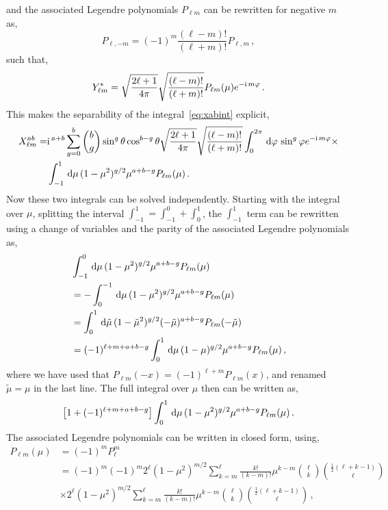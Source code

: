 and the associated Legendre polynomials $P_{\ell m}$ can be rewritten for negative $m$ as, 
\begin{equation}
	P_{\ell,-m} = (-1)^m \frac{(\ell - m)!}{(\ell + m)!} P_{\ell,m}\,,
\end{equation}
such that, 
\begin{equation}
	Y^*_{\ell m} = \sqrt{\frac{2\ell + 1}{4 \pi}} \sqrt{\frac{(\ell - m)!}{(\ell + m)!}} P_{\ell m}(\mu) e^{-\mathrm{i\,} m \varphi} \,.
\end{equation}
This makes the separability of the integral~\eqref{eq:xabint} explicit, 
\begin{align}
	X_{\ell m}^{ab} =& \mathrm{i\,}^{a+b} \sum_{g=0}^b \binom{b}{g} \sin^g\theta \cos^{b-g}\theta \sqrt{\frac{2\ell + 1}{4\pi}} \sqrt{\frac{(\ell - m)!}{(\ell + m)!}} \int_0^{2\pi}\,\mathrm{d}\varphi\, \sin^g\varphi e^{-\mathrm{i\,} m \varphi} \times \nonumber \\
	& \int_{-1}^1 \,\mathrm{d}\mu\, (1-\mu^2)^{g/2} \mu^{a+b-g} P_{\ell m}(\mu)\,.
\end{align}
Now these two integrals can be solved independently. Starting with the integral over $\mu$, splitting the interval $\int_{-1}^1 = \int_{-1}^0 + \int_0^1$, the $\int_{-1}^1$ term can be rewritten using a change of variables and the parity of the associated Legendre polynomials as, 
\begin{align}
	&\int_{-1}^0\,\mathrm{d}\mu\, (1-\mu^2)^{g/2} \mu^{a+b-g} P_{\ell m}(\mu) \nonumber \\
	&= - \int_0^{-1}\,\mathrm{d}\mu\, (1-\mu^2)^{g/2} \mu^{a+b-g} P_{\ell m}(\mu) \nonumber \\
	&= \int_0^1\,\mathrm{d}\tilde{\mu}\, (1-\tilde{\mu}^2)^{g/2}(-\tilde{\mu})^{a+b-g} P_{\ell m}(-\tilde{\mu}) \nonumber \\
	&= (-1)^{\ell + m + a + b - g} \int_0^1 \,\mathrm{d}\mu\, (1-\mu)^{g/2} \mu^{a+b-g} P_{\ell m}(\mu)\,,
\end{align}
where we have used that $P_{\ell m}(-x) = (-1)^{\ell + m} P_{\ell m}(x)$, and renamed $\tilde{\mu} = \mu$ in the last line. The full integral over $\mu$ then can be written as, 
\begin{equation}
	\left[ 1 + (-1)^{\ell+m+a+b-g} \right] \int_0^1 \,\mathrm{d}\mu\, (1-\mu^2)^{g/2} \mu^{a+b-g} P_{\ell m}(\mu)\,.
\end{equation}
The associated Legendre polynomials can be written in closed form, using, 
\begin{align}
	P_{\ell m}(\mu) &= (-1)^m P_\ell^m \nonumber \\
	&= (-1)^m (-1)^m 2^\ell (1-\mu^2)^{m/2} \sum_{k = m}^\ell \frac{k!}{(k-m)!} \mu^{k-m} \binom{\ell}{k} \binom{\frac{1}{2}(\ell + k - 1)}{\ell} \nonumber \\
	& \times 2^\ell (1-\mu^2)^{m/2} \sum_{k = m}^\ell \frac{k!}{(k-m)!} \mu^{k-m} \binom{\ell}{k} \binom{\frac{1}{2}(\ell + k - 1)}{\ell}\,,
\end{align}

